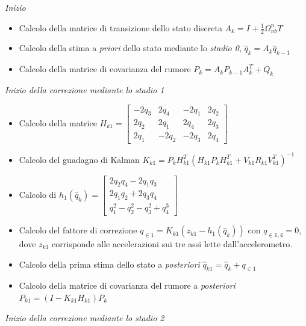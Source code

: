\textit{Inizio}
\begin{itemize}
	\item Calcolo della matrice di transizione dello stato discreta $A_k= I + \frac{1}{2} \Omega_{nb}^n T$
	\item Calcolo della stima a \textit{priori} dello stato mediante lo \textit{stadio 0},  $\hat{q}_k = A_k\hat{q}_{k-1}$
	\item Calcolo della matrice di covarianza del rumore  $P_k = A_kP_{k-1}A_k^T + Q_k$
\end{itemize}

\textit{Inizio della correzione mediante lo stadio 1}
\begin{itemize}
\item Calcolo della matrice $H_{k1} = \begin{bmatrix}
-2q_3 & 2q_4 & -2q_1 & 2q_2  \\
2q_2 & 2q_1 & 2q_4 & 2q_3\\
2q_1 & -2q_2 & -2q_3 & 2q_4
\end{bmatrix}$
\item Calcolo del guadagno di Kalman $K_{k1} = P_k H_{k1}^T ( H_{k1} P_k H_{k1}^T + V_{k1}R_{k1}V_{k1}^T)^{-1}$
\item Calcolo di $h_1(\hat{q}_k) = \begin{bmatrix}
2q_2q_4 - 2q_1q_3  \\
2q_1q_2 + 2q_3q_4 \\
q_1^2 - q_2^2 - q_3^2 + q_4^3
\end{bmatrix} $
\item Calcolo del fattore di correzione  $q_{\in 1} = K_{k1}(z_{k1}-h_1(\hat{q}_k))$ con $ q_{\in1,4} =0$, dove $z_{k1}$ corrisponde alle accelerazioni sui tre assi lette dall'accelerometro.
\item Calcolo della prima stima dello stato a \textit{posteriori}  $\hat{q}_{k1}= \hat{q}_k + q_{\in1}$
\item Calcolo della matrice di covarianza del rumore a \textit{posteriori} $P_{k1} = ( I - K_{k1}H_{k1})P_k$
\end{itemize}
\textit{Inizio della correzione mediante lo stadio 2}
